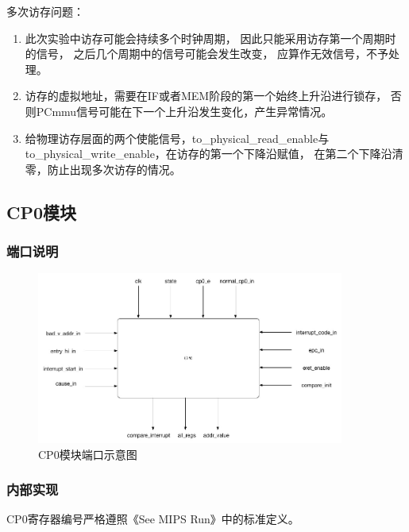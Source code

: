             多次访存问题：%
            \begin{minipage}[t]{0.8\linewidth}
                \begin{enumerate}
                \item
                    此次实验中访存可能会持续多个时钟周期，%
                    因此只能采用访存第一个周期时的信号，%
                    之后几个周期中的信号可能会发生改变，%
                    应算作无效信号，不予处理。
                \item
                    访存的虚拟地址，需要在IF或者MEM阶段的第一个始终上升沿进行锁存，%
                    否则PCmmu信号可能在下一个上升沿发生变化，产生异常情况。
                \item
                    给物理访存层面的两个使能信号，to\_physical\_read\_enable与
                    to\_physical\_write\_enable，在访存的第一个下降沿赋值，
                    在第二个下降沿清零，防止出现多次访存的情况。
                \end{enumerate}
            \end{minipage}
            
    \subsection{CP0模块}
        \subsubsection{端口说明}
            
            \begin{figure}[!hbp]
                \centering
                \caption{CP0模块端口示意图}
                \includegraphics[width=0.9\textwidth]{chart/cp0.jpg}
            \end{figure}
        \subsubsection{内部实现}
            CP0寄存器编号严格遵照《See MIPS Run》中的标准定义。

